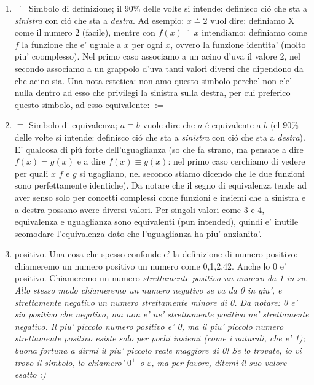 \begin{enumerate}
  \item{\b{$\doteq$}} Simbolo di definizione; il $90\%$ delle volte si intende: definisco ci\'o che sta a {\em sinistra} con ci\'o che sta a {\em destra}. Ad esempio: $ x \doteq 2$ vuol dire: definiamo X come il numero 2 (facile),
  mentre con $ f(x) \doteq x$ intendiamo: definiamo come $f$ la funzione che e' uguale a $x$ per ogni $x$, ovvero la funzione identita' (molto piu' coomplesso). Nel primo caso associamo a un acino d'uva il valore 2, nel secondo
  associamo a un grappolo d'uva tanti valori diversi che dipendono da che acino sia. Una nota estetica: non amo questo simbolo perche' non c'e' nulla dentro ad esso che 
  privilegi la sinistra sulla destra, per cui preferico questo simbolo, ad esso equivalente: $:=$
  \item{$\equiv$} Simbolo di equivalenza; $a \equiv b$ vuole dire che $a$ \'e equivalente a $b$ (el $90\%$ delle volte si intende: definisco ci\'o che sta a {\em sinistra}
  con ci\'o che sta a {\em destra}). E' qualcosa di pi\'u forte dell'uguaglianza (so che fa strano, ma pensate a dire $f(x)=g(x)$ e a dire $f(x) \equiv g(x)$: nel primo caso
  cerchiamo di vedere per quali $x$ $f$ e $g$ si ugagliano, nel secondo stiamo dicendo che le due funzioni sono perfettamente identiche). Da notare che il segno di equivalenza 
  tende ad aver senso solo per concetti complessi come funzioni e insiemi che a sinistra e a destra possano avere diversi valori. Per singoli valori come 3 e 4, equivalenza 
  e uguaglianza sono equivalenti (pun intended), quindi e' inutile scomodare l'equivalenza dato che l'uguaglianza ha piu' anzianita'.
  \item{positivo}. Una cosa che spesso confonde e' la definizione di numero positivo: chiameremo un numero positivo un numero come 0,1,2,42. Anche lo 0 e' positivo. Chiameremo 
    un numero \em{strettamente positivo} un numero da 1 in su. Allo stesso modo chiameremo un numero negativo se va da 0 in giu', e strettamente negativo un numero strettamente minore di 0.
    Da notare: 0 e' sia positivo che negativo, ma non e' ne' strettamente positivo ne' strettamente negativo. Il piu' piccolo numero positivo e' 0, ma il piu' piccolo 
    numero strettamente positivo esiste solo per pochi insiemi (come i naturali, che e' 1); buona fortuna a dirmi il piu' piccolo reale maggiore di 0! Se lo 
    trovate, io vi trovo il simbolo, lo chiamero' $0^+$ o $\varepsilon$, ma per favore, ditemi il suo valore esatto ;)
\end{enumerate}

